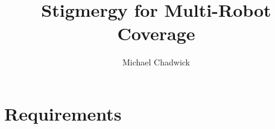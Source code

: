 \documentclass[openany,a4paper,12pt]{book}
\title{Stigmergy for Multi-Robot Coverage}
\author{Michael Chadwick}
\begin{document}
\maketitle
\tableofcontents

\part{Requirements}


%


%


%
%
%
%
%
%
%
%

\printbibliography
\end{document}
